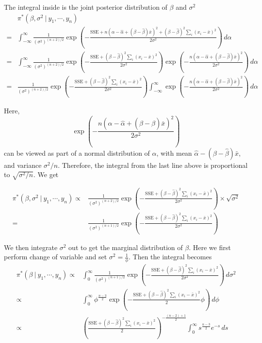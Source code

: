 \documentclass[]{book}
\theoremstyle{definition}
\theoremstyle{definition}
\theoremstyle{definition}
\theoremstyle{remark}
\begin{document}
The integral inside is the joint posterior distribution of \(\beta\) and
\(\sigma^2\) \[
\begin{aligned}
& \pi^*(\beta, \sigma^2~|~y_1,\cdots,y_n) \\
= & \int_{-\infty}^\infty \frac{1}{(\sigma^2)^{(n+2)/2}}\exp\left(-\frac{\text{SSE}+n(\alpha-\hat{\alpha}+(\beta-\hat{\beta})\bar{x})^2+(\beta-\hat{\beta})^2\sum_i(x_i-\bar{x})^2}{2\sigma^2}\right)\, d\alpha\\
= & \int_{-\infty}^\infty \frac{1}{(\sigma^2)^{(n+2)/2}}\exp\left(-\frac{\text{SSE}+(\beta-\hat{\beta})^2\sum_i(x_i-\bar{x})^2}{2\sigma^2}\right) \exp\left(-\frac{n(\alpha-\hat{\alpha}+(\beta-\hat{\beta})\bar{x})^2}{2\sigma^2}\right)\, d\alpha \\
= & \frac{1}{(\sigma^2)^{(n+2)/2}}\exp\left(-\frac{\text{SSE}+(\beta-\hat{\beta})^2\sum_i(x_i-\bar{x})^2}{2\sigma^2}\right) \int_{-\infty}^\infty \exp\left(-\frac{n(\alpha-\hat{\alpha}+(\beta-\hat{\beta})\bar{x})^2}{2\sigma^2}\right)\, d\alpha
\end{aligned}
\]

Here,
\[ \exp\left(-\frac{n(\alpha-\hat{\alpha}+(\beta - \hat{\beta})\bar{x})^2}{2\sigma^2}\right) \]
can be viewed as part of a normal distribution of \(\alpha\), with mean
\(\hat{\alpha}-(\beta-\hat{\beta})\bar{x}\), and variance
\(\sigma^2/n\). Therefore, the integral from the last line above is
proportional to \(\sqrt{\sigma^2/n}\). We get

\[
\begin{aligned}
\pi^*(\beta, \sigma^2~|~y_1,\cdots,y_n) 
\propto & \frac{1}{(\sigma^2)^{(n+2)/2}}\exp\left(-\frac{\text{SSE}+(\beta-\hat{\beta})^2\sum_i(x_i-\bar{x})^2}{2\sigma^2}\right) \times \sqrt{\sigma^2}\\
= & \frac{1}{(\sigma^2)^{(n+1)/2}}\exp\left(-\frac{\text{SSE}+(\beta-\hat{\beta})^2\sum_i (x_i-\bar{x})^2}{2\sigma^2}\right)
\end{aligned}
\]

We then integrate \(\sigma^2\) out to get the marginal distribution of
\(\beta\). Here we first perform change of variable and set
\(\sigma^2 = \frac{1}{\phi}\). Then the integral becomes \[
\begin{aligned}
\pi^*(\beta~|~y_1,\cdots, y_n) \propto & \int_0^\infty \frac{1}{(\sigma^2)^{(n+1)/2}}\exp\left(-\frac{\text{SSE} + (\beta-\hat{\beta})^2\sum_i(x_i-\bar{x})^2}{2\sigma^2}\right)\, d\sigma^2 \\
\propto & \int_0^\infty \phi^{\frac{n-3}{2}}\exp\left(-\frac{\text{SSE}+(\beta-\hat{\beta})^2\sum_i(x_i-\bar{x})^2}{2}\phi\right)\, d\phi\\
\propto & \left(\frac{\text{SSE}+(\beta-\hat{\beta})^2\sum_i(x_i-\bar{x})^2}{2}\right)^{-\frac{(n-2)+1}{2}}\int_0^\infty s^{\frac{n-3}{2}}e^{-s}\, ds
\end{aligned}
\]
\end{document}
